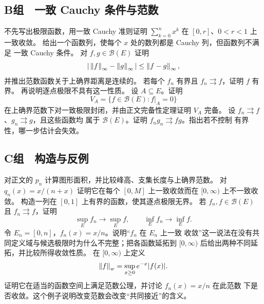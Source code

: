 \subsection*{B组　一致 Cauchy 条件与范数}
\begin{enumerate}[label=\textbf{\thechapter.\arabic*.},resume]
 不先写出极限函数，用一致 Cauchy 准则证明
 \(\sum_{k=0}^n x^k\) 在 \([0,r]\)、\(0<r<1\) 上一致收敛。
 给出一个函数列，使每个 \(x\) 处的数列都是 Cauchy 列，但函数列不满足
 一致 Cauchy 条件。
 对 \(f,g\in\mathcal B(E)\) 证明
 \[
  |\left\lVert f\right\rVert_\infty-\left\lVert g\right\rVert_\infty|\le\left\lVert f-g\right\rVert_\infty,
 \]
 并推出范数函数关于上确界距离是连续的。
 若每个 \(f_n\) 有界且 \(f_n\rightrightarrows f\)，证明 \(f\) 有界。
 再说明逐点极限不具有这一性质。
 设 \(A\subseteq E\)。证明
 \[
  V_A=\{f\in\mathcal B(E):f|_A=0\}
 \]
 在上确界范数下对一致极限封闭，并由正文完备性定理证明 \(V_A\) 完备。
 设 \(f_n\rightrightarrows f\)、\(g_n\rightrightarrows g\)，且这些函数均
 属于 \(\mathcal B(E)\)。证明 \(f_ng_n\rightrightarrows fg\)。指出若不控制
 有界性，哪一步估计会失效。
\end{enumerate}

\subsection*{C组　构造与反例}
\begin{enumerate}[label=\textbf{\thechapter.\arabic*.},resume]
 对正文的 \(p_n\) 计算图形面积，并比较峰高、支集长度与上确界范数。
 对 \(q_n(x)=x/(n+x)\) 证明它在每个 \([0,M]\) 上一致收敛而在
 \([0,\infty)\) 上不一致收敛。
 构造一列在 \([0,1]\) 上有界的函数，使其逐点极限无界。
 若 \(f_n,f\in\mathcal B(E)\) 且 \(f_n\rightrightarrows f\)，证明
 \[
  \sup_E f_n\to\sup_E f,\qquad \inf_E f_n\to\inf_E f.
 \]
 令 \(E_n=[0,n]\)，\(f_n(x)=x/n\)。说明“\(f_n\) 在 \(E_n\) 上一致
 收敛”这一说法在没有共同定义域与候选极限时为什么不完整；把各函数延拓到
 \([0,\infty)\) 后给出两种不同延拓，并比较所得收敛性质。
 在 \([0,\infty)\) 上定义
 \[
  \left\lVert f\right\rVert_w=\sup_{x\ge0}e^{-x}|f(x)|.
 \]
 证明它在适当的函数空间上满足范数公理，并讨论 \(f_n(x)=x/n\) 在此范数
 下是否收敛。这个例子说明改变范数会改变“共同接近”的含义。
\end{enumerate}
